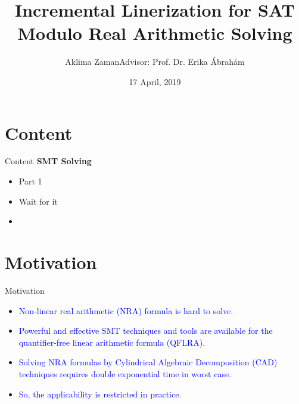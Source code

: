 \documentclass[]{beamer}
\begin{document}
\RWTHtoc

\title[Incremental Linearization for SAT Modulo Real Arithmetic Solving]{Incremental Linerization for SAT Modulo Real Arithmetic Solving}

\author[Aklima Zaman]{\textcolor{RWTHblue}{Aklima Zaman}\linebreak Advisor: Prof. Dr. Erika Ábrahám}

\institute[]{}

\date{17 April, 2019}


\frame{
	\titlepage	
}

\section{Content}
\begin{frame}{Content}
    \textbf{SMT Solving}
    \begin{itemize}
        \pause
        \item Part 1
        \pause
		\item Wait for it
		\item 
    \end{itemize}
\end{frame}

\section{Motivation}
\begin{frame}{Motivation}
    \begin{itemize}
        \item \textcolor<1>{blue}{Non-linear real arithmetic (NRA) formula is hard to solve.}
        \item \textcolor<2>{blue}{Powerful and effective SMT techniques and tools are available for the quantifier-free linear arithmetic formula (QFLRA).}
		\item \textcolor<3>{blue}{Solving NRA formulas by Cylindrical Algebraic Decomposition (CAD) techniques requires double exponential time in worst case.}
		\item \textcolor<4>{blue}{So, the applicability is restricted in practice.}
    \end{itemize}
\end{frame}
\end{document}
